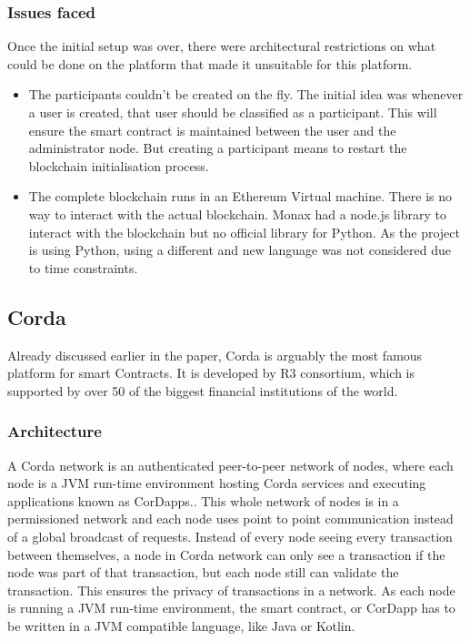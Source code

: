 \subsubsection{Issues faced}
Once the initial setup was over, there were architectural restrictions on what could be done on the platform that made it unsuitable for this platform. 
\begin{itemize}
    \item The participants couldn't be created on the fly. The initial idea was whenever a user is created, that user should be classified as a participant. This will ensure the smart contract is maintained between the user and the administrator node. But creating a participant means to restart the blockchain initialisation process.
    \item The complete blockchain runs in an Ethereum Virtual machine. There is no way to interact with the actual blockchain. Monax had a node.js library to interact with the blockchain but no official library for Python. As the project is using Python, using a different and new language was not considered due to time constraints.
\end{itemize}

\subsection{Corda}
Already discussed earlier in the paper, Corda is arguably the most famous platform for smart Contracts. It is developed by R3 consortium, which is supported by over 50 of the biggest financial institutions of the world.
\subsubsection{Architecture}
A Corda network is an authenticated peer-to-peer network of nodes, where each node is a JVM run-time environment hosting Corda services and executing applications known as CorDapps.\cite{Hearn2016Corda:Ledger}. This whole network of nodes is in a permissioned network and each node uses point to point communication instead of a global broadcast of requests. Instead of every node seeing every transaction between themselves, a node in Corda network can only see a transaction if the node was part of that transaction, but each node still can validate the transaction. This ensures the privacy of transactions in a network.
As each node is running a JVM run-time environment, the smart contract, or CorDapp has to be written in a JVM compatible language, like Java or Kotlin.


